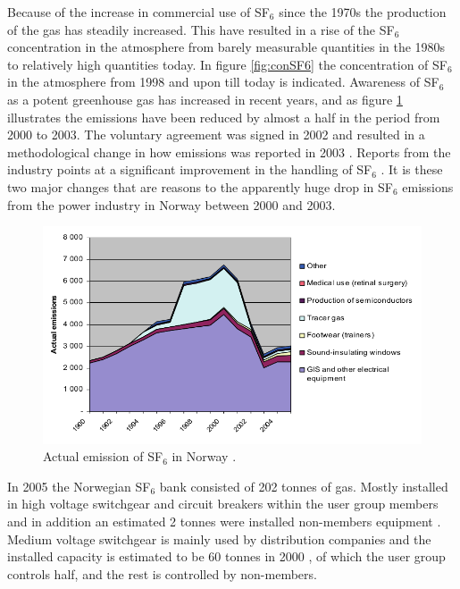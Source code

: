\documentclass[10pt,a4paper,twoside]{article}
\begin{document}
Because of the increase in commercial use of SF$_6$ since the 1970s the production of the gas has steadily increased. This have resulted in a rise of the SF$_6$ concentration in the atmosphere from barely measurable quantities in the 1980s \cite{bib:SF6PI} to relatively high quantities today. In figure \ref{fig:conSF6} the concentration of SF$_6$ in the atmosphere from 1998 and upon till today is indicated. Awareness of SF$_6$ as a potent greenhouse gas has increased in recent years, and as figure \ref{fig:SF6EmissNor} illustrates the emissions have been reduced by almost a half in the period from 2000 to 2003. The voluntary agreement was signed in 2002 and resulted in a methodological change in how emissions was reported in 2003 \cite{bib:regSF6Miljo}. Reports from the industry points at a significant improvement in the handling of SF$_6$ \cite{bib:StatSF6}. It is these two major changes that are reasons to the apparently huge drop in SF$_6$ emissions from the power industry in Norway between 2000 and 2003.

\begin{figure}[H]
\centering
\includegraphics[scale=0.6]{Bilder/Theory/emissionsSF6Norway.png}
\caption{Actual emission of SF$_6$ in Norway \cite{bib:StatSF6}.} \label{fig:SF6EmissNor}
\end{figure}

In 2005 the Norwegian SF$_6$ bank consisted of 202 tonnes of gas. Mostly installed in high voltage switchgear and circuit breakers within the user group members and in addition an estimated 2 tonnes were installed non-members equipment \cite{bib:StatSF6}. Medium voltage switchgear is mainly used by distribution companies and the installed capacity is estimated to be 60 tonnes in 2000 \cite{bib:StatSF6}, of which the user group controls half, and the rest is controlled by non-members.
\end{document}
